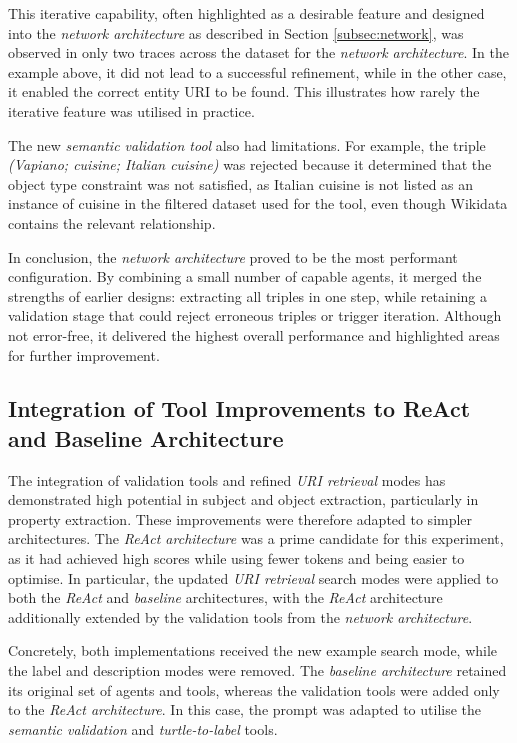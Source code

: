 \documentclass[a4paper,oneside,bibliography=totoc]{scrbook}
\begin{document}
This iterative capability, often highlighted as a desirable feature and designed into the \textit{network architecture} as described in Section \ref{subsec:network}, was observed in only two traces across the dataset for the \textit{network architecture}. In the example above, it did not lead to a successful refinement, while in the other case, it enabled the correct entity \ac{URI} to be found. This illustrates how rarely the iterative feature was utilised in practice.

The new \textit{semantic validation tool} also had limitations. For example, the triple \textit{(Vapiano; cuisine; Italian cuisine)} was rejected because it determined that the object type constraint was not satisfied, as Italian cuisine is not listed as an instance of cuisine in the filtered dataset used for the tool, even though Wikidata contains the relevant relationship.

In conclusion, the \textit{network architecture} proved to be the most performant configuration. By combining a small number of capable agents, it merged the strengths of earlier designs: extracting all triples in one step, while retaining a validation stage that could reject erroneous triples or trigger iteration. Although not error-free, it delivered the highest overall performance and highlighted areas for further improvement.

\subsection{Integration of Tool Improvements to ReAct and Baseline Architecture}
\label{subsec:performance_increases_gen2}

The integration of validation tools and refined \textit{\ac{URI} retrieval} modes has demonstrated high potential in subject and object extraction, particularly in property extraction. These improvements were therefore adapted to simpler architectures. The \textit{\ac{ReAct} architecture} was a prime candidate for this experiment, as it had achieved high scores while using fewer tokens and being easier to optimise. In particular, the updated \textit{\ac{URI} retrieval} search modes were applied to both the \textit{\ac{ReAct}} and \textit{baseline} architectures, with the \textit{\ac{ReAct}} architecture additionally extended by the validation tools from the \textit{network architecture}.

Concretely, both implementations received the new example search mode, while the label and description modes were removed. The \textit{baseline architecture} retained its original set of agents and tools, whereas the validation tools were added only to the \textit{\ac{ReAct} architecture}. In this case, the prompt was adapted to utilise the \textit{semantic validation} and \textit{turtle-to-label} tools.
\end{document}
